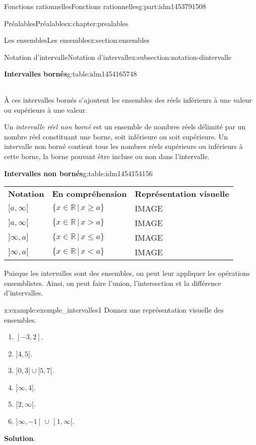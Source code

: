 \documentclass[oneside,10pt,]{book}
\newcommand{\blocktitlefont}{\relax}
\newcommand{\tabularfont}{\relax}
\newcommand{\hrulethin}  {\noalign{\hrule height 0.04em}}
\newcommand{\telque}{ \,|\, }
\newcommand{\lt}{<}
\newcommand{\gt}{>}
\begin{document}
\begin{partptx}{Fonctions rationnelles}{}{Fonctions rationnelles}{}{}{g:part:idm1453791508}
\begin{chapterptx}{Préalables}{}{Préalables}{}{}{x:chapter:prealables}
\begin{sectionptx}{Les ensembles}{}{Les ensembles}{}{}{x:section:ensembles}
\begin{subsectionptx}{Notation d'intervalle}{}{Notation d'intervalle}{}{}{x:subsection:notation-dintervalle}
\begin{tableptx}{\textbf{Intervalles bornés}}{g:table:idm1454165748}{}
{\begin{tabular}{lll}
\end{tabular}
}%
\end{tableptx}%
%
\par
À ces intervalles bornés s'ajoutent les ensembles des réels inférieurs à une valeur ou supérieurs à une valeur.%
\par
Un \emph{intervalle réel non borné} est un ensemble de nombres réels délimité par un nombre réel constituant une borne, soit inférieure ou soit supérieure. Un intervalle non borné contient tous les nombres réels supérieurs ou inférieurs à cette borne, la borne pouvant être incluse ou non dans l'intervalle.%
\par
\begin{tableptx}{\textbf{Intervalles non bornés}}{g:table:idm1454154156}{}%
\centering%
{\tabularfont%
\begin{tabular}{lll}
\textbf{Notation}&\textbf{En compréhension}&\textbf{Représentation visuelle}\tabularnewline\hrulethin
\([a, \infty[\)&\(\{x \in \mathbb{R} \telque x \geqslant a\}\)&IMAGE\tabularnewline[0pt]
\(]a, \infty[\)&\(\{x \in \mathbb{R} \telque x \gt a\}\)&IMAGE\tabularnewline[0pt]
\(]\infty, a]\)&\(\{x \in \mathbb{R} \telque x \leqslant a\}\)&IMAGE\tabularnewline[0pt]
\(]\infty, a[\)&\(\{x \in \mathbb{R} \telque x \lt a\}\)&IMAGE
\end{tabular}
}%
\end{tableptx}%
%
\par
Puisque les intervalles sont des ensembles, on peut leur appliquer les opérations ensemblistes. Ainsi, on peut faire l'union, l'intersection et la différence d’intervalles.%
\par
\begin{example}{}{x:example:exemple_intervalles1}%
Donnez une représentation visuelle des ensembles.%
%
\begin{multicols}{3}
\begin{enumerate}
\item{}\([-3,2]\).%
\item{}\(]4,5[\).%
\item{}\(]0,3] \cup [5,7[\).%
\item{}\(]\infty,4]\).%
\item{}\([2,\infty[\).%
\item{}\(]\infty,-1[ \,\cup\, ]1, \infty[\).%
\end{enumerate}
\end{multicols}
\par\smallskip%
\noindent\textbf{\blocktitlefont Solution}.\hypertarget{g:solution:idm1454138532}{}\quad{}%

\end{example}
\end{subsectionptx}
\end{sectionptx}
\end{chapterptx}
\end{partptx}
\end{document}
